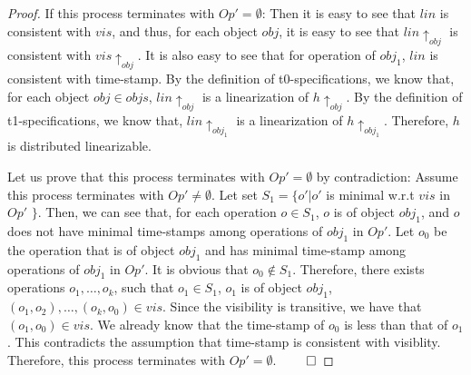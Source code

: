 {\begin {proof}
If this process terminates with $\mathit{Op}' = \emptyset$: Then it is easy to see that $\mathit{lin}$ is consistent with $\mathit{vis}$, and thus, for each object $\mathit{obj}$, it is easy to see that $\mathit{lin} \uparrow_{\mathit{obj}}$ is consistent with $\mathit{vis} \uparrow_{\mathit{obj}}$. It is also easy to see that for operation of $\mathit{obj}_1$, $\mathit{lin}$ is consistent with time-stamp. By the definition of t0-specifications, we know that, for each object $\mathit{obj} \in \mathit{objs}$, $\mathit{lin} \uparrow_{\mathit{obj}}$ is a linearization of $h \uparrow_{\mathit{obj}}$. By the definition of t1-specifications, we know that, $\mathit{lin} \uparrow_{\mathit{obj}_1}$ is a linearization of $h \uparrow_{\mathit{obj}_1}$. Therefore, $h$ is distributed linearizable.

Let us prove that this process terminates with $\mathit{Op}' = \emptyset$ by contradiction: Assume this process terminates with $\mathit{Op}' \neq \emptyset$. Let set $S_1 = \{ o' \vert o'$ is minimal w.r.t $\mathit{vis}$ in $\mathit{Op}'$ $\}$. Then, we can see that, for each operation $o \in S_1$, $o$ is of object $\mathit{obj}_1$, and $o$ does not have minimal time-stamps among operations of $\mathit{obj}_1$ in $\mathit{Op}'$. Let $o_0$ be the operation that is of object $\mathit{obj}_1$ and has minimal time-stamp among operations of $\mathit{obj}_1$ in $\mathit{Op}'$. It is obvious that $o_0 \notin S_1$. Therefore, there exists operations $o_1,\ldots,o_k$, such that $o_1 \in S_1$, $o_1$ is of object $\mathit{obj}_1$, $(o_1,o_2),\ldots,(o_k,o_0) \in \mathit{vis}$. Since the visibility is transitive, we have that $(o_1,o_0) \in \mathit{vis}$. We already know that the time-stamp of $o_0$ is less than that of $o_1$. This contradicts the assumption that time-stamp is consistent with visiblity. Therefore, this process terminates with $\mathit{Op}' = \emptyset$. $\qed$

\end {proof}






}
